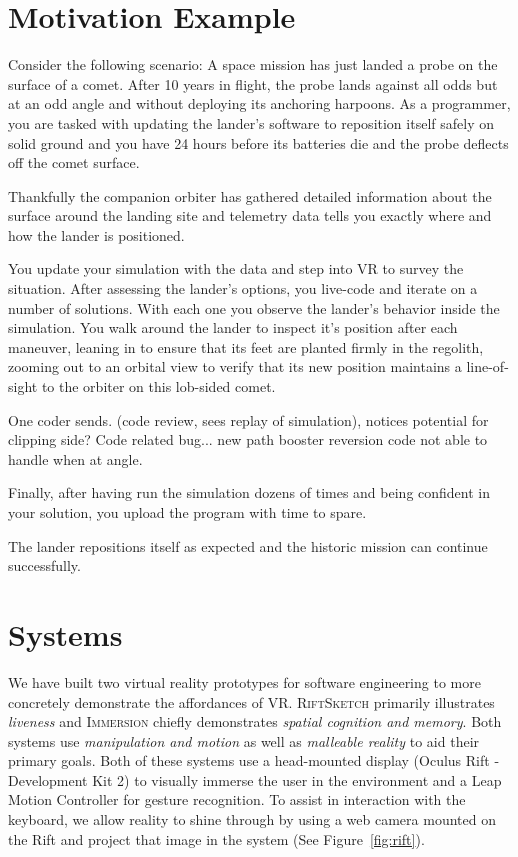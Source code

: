 \documentclass[conference]{IEEEtran}
\begin{document}
\section{Motivation Example}

Consider the following scenario: A space mission has just landed a probe on the surface of a comet.
After 10 years in flight, the probe lands against all odds but at an odd angle and without deploying its anchoring harpoons. 
As a programmer, you are tasked with updating the lander's software to reposition itself safely on solid ground and you have 24 hours before its batteries die and the probe deflects off the comet surface.

Thankfully the companion orbiter has gathered detailed information about the surface around the landing site and telemetry data tells you exactly where and how the lander is positioned. 

You update your simulation with the data and step into VR to survey the situation. 
After assessing the lander's options, you live-code and iterate on a number of solutions. 
With each one you observe the lander's behavior inside the simulation. 
You walk around the lander to inspect it's position after each maneuver, leaning in to ensure that its feet are planted firmly in the regolith, zooming out to an orbital view to verify that its new position maintains a line-of-sight to the orbiter on this lob-sided comet. 

One coder sends. (code review, sees replay of simulation), notices potential for clipping side?  Code related bug... new path booster reversion code not able to handle when at angle.

Finally, after having run the simulation dozens of times and being confident in your solution, you upload the program with time to spare. 


The lander repositions itself as expected and the historic mission can continue successfully.
  

\section{Systems}

We have built two virtual reality prototypes for software engineering to more concretely demonstrate the affordances of VR. 
\textsc{RiftSketch} primarily illustrates \emph{liveness} and \textsc{Immersion} chiefly demonstrates \emph{spatial cognition and memory}.
Both systems use \emph{manipulation and motion} as well as \emph{malleable reality} to aid their primary goals.
Both of these systems use a head-mounted display (Oculus Rift - Development Kit 2) to visually immerse the user in the environment and a Leap Motion Controller for gesture recognition.
To assist in interaction with the keyboard, we allow reality to shine through by using a web camera mounted on the Rift and project that image in the system (See Figure~\ref{fig:rift}).
\end{document}
